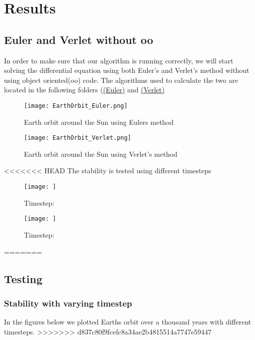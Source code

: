 \documentclass[../main.tex]{subfiles}
\begin{document}
\section{Results}\label{results}
\subsection{Euler and Verlet without oo}
In order to make sure that our algorithm is running correctly, we will start solving the differential equation using both Euler's and Verlet's method without using object oriented(oo) code. The algorithms used to calculate the two are located in the following folders (\href{https://github.com/kmaasrud/Project-5/tree/master/code/Earth-Sun_Euler-FWD}{(Euler)} and \href{https://github.com/kmaasrud/Project-5/tree/master/code/Earth-Sun_Verlet}{(Verlet)}

\begin{figure}[!h]
  \centering
  \parbox{5cm}{
  \texttt{[image: EarthOrbit\_Euler.png]}
  \caption{Earth orbit around the Sun using Eulers method}
  \label{fig:EarthOrbit_Euler}}
  \qquad
  \begin{minipage}{5cm}
    \texttt{[image: EarthOrbit\_Verlet.png]}
    \caption{Earth orbit around the Sun using Verlet's method}
    \label{fig:EarthOrbit_Verlet}
  \end{minipage}
  \end{figure}
\FloatBarrier


<<<<<<< HEAD
The stability is tested using different timesteps
\begin{figure}[!h]
  \centering
  \parbox{5cm}{
  \texttt{[image: ]}
  \caption{Timestep: }
  \label{fig:}}
  \qquad
  \begin{minipage}{5cm}
    \texttt{[image: ]}
    \caption{Timestep: }
    \label{fig:}
  \end{minipage}
  \end{figure}
\FloatBarrier
=======
\subsection{Testing}
\subsubsection{Stability with varying timestep} \label{sec:results-test-timestep}
In the figures below we plotted Earths orbit over a thousand years with different timesteps.
>>>>>>> d837c80f9fcefc8a34ae2b4815514a7747e59447
\end{document}
